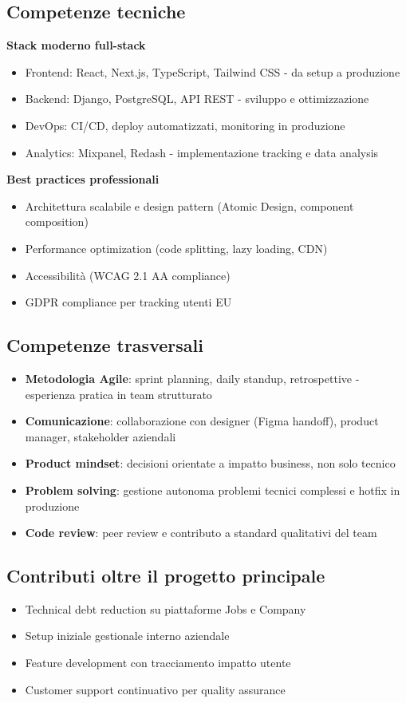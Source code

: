 \subsection{Competenze tecniche}
\textbf{Stack moderno full-stack}
\begin{itemize}
  \item Frontend: React, Next.js, TypeScript, Tailwind CSS - da setup a produzione
  \item Backend: Django, PostgreSQL, API REST - sviluppo e ottimizzazione
  \item DevOps: CI/CD, deploy automatizzati, monitoring in produzione
  \item Analytics: Mixpanel, Redash - implementazione tracking e data analysis
\end{itemize}

\textbf{Best practices professionali}
\begin{itemize}
  \item Architettura scalabile e design pattern (Atomic Design, component composition)
  \item Performance optimization (code splitting, lazy loading, CDN)
  \item Accessibilità (WCAG 2.1 AA compliance)
  \item GDPR compliance per tracking utenti EU
\end{itemize}

\subsection{Competenze trasversali}
\begin{itemize}
  \item \textbf{Metodologia Agile}: sprint planning, daily standup, retrospettive - esperienza pratica in team strutturato
  \item \textbf{Comunicazione}: collaborazione con designer (Figma handoff), product manager, stakeholder aziendali
  \item \textbf{Product mindset}: decisioni orientate a impatto business, non solo tecnico
  \item \textbf{Problem solving}: gestione autonoma problemi tecnici complessi e hotfix in produzione
  \item \textbf{Code review}: peer review e contributo a standard qualitativi del team
\end{itemize}

\subsection{Contributi oltre il progetto principale}
\begin{itemize}
  \item Technical debt reduction su piattaforme Jobs e Company
  \item Setup iniziale gestionale interno aziendale
  \item Feature development con tracciamento impatto utente
  \item Customer support continuativo per quality assurance
\end{itemize}


